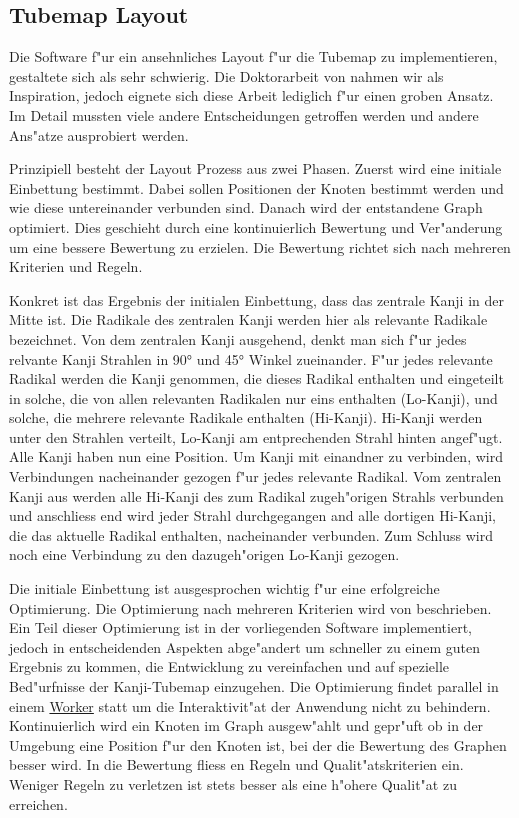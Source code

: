 \subsection{Tubemap Layout}

Die Software f"ur ein ansehnliches Layout f"ur die Tubemap zu
implementieren, gestaltete sich als sehr schwierig. Die Doktorarbeit von
\cite{automaticlayoutmetro08} nahmen wir als Inspiration, jedoch eignete
sich diese Arbeit lediglich f"ur einen groben Ansatz. Im Detail mussten
viele andere Entscheidungen getroffen werden und andere Ans"atze
ausprobiert werden.

Prinzipiell besteht der Layout Prozess aus zwei Phasen. Zuerst wird eine
initiale Einbettung bestimmt. Dabei sollen Positionen der Knoten
bestimmt werden und wie diese untereinander verbunden sind. Danach wird
der entstandene Graph optimiert. Dies geschieht durch eine
kontinuierlich Bewertung und Ver"anderung um eine bessere Bewertung zu
erzielen. Die Bewertung richtet sich nach mehreren Kriterien und Regeln.

Konkret ist das Ergebnis der initialen Einbettung, dass das zentrale
Kanji in der Mitte ist. Die Radikale des zentralen Kanji werden hier als
relevante Radikale bezeichnet. Von dem zentralen Kanji ausgehend, denkt
man sich f"ur jedes relvante Kanji Strahlen in 90° und 45° Winkel
zueinander. F"ur jedes relevante Radikal werden die Kanji genommen, die
dieses Radikal enthalten und eingeteilt in solche, die von allen
relevanten Radikalen nur eins enthalten (Lo-Kanji), und solche, die
mehrere relevante Radikale enthalten (Hi-Kanji). Hi-Kanji werden unter
den Strahlen verteilt, Lo-Kanji am entprechenden Strahl hinten
angef"ugt. Alle Kanji haben nun eine Position. Um Kanji mit einandner
zu verbinden, wird Verbindungen nacheinander gezogen f"ur jedes relevante
Radikal. Vom zentralen Kanji aus werden alle Hi-Kanji des zum Radikal
zugeh"origen Strahls verbunden und anschliess end wird jeder Strahl
durchgegangen and alle dortigen Hi-Kanji, die das aktuelle Radikal
enthalten, nacheinander verbunden. Zum Schluss wird noch eine Verbindung
zu den dazugeh"origen Lo-Kanji gezogen.

Die initiale Einbettung ist ausgesprochen wichtig f"ur eine erfolgreiche
Optimierung. Die Optimierung nach mehreren Kriterien wird von
\cite{automaticmetromap11} beschrieben. Ein Teil dieser Optimierung ist
in der vorliegenden Software implementiert, jedoch in entscheidenden
Aspekten abge"andert um schneller zu einem guten Ergebnis zu kommen, die
Entwicklung zu vereinfachen und auf spezielle Bed"urfnisse der
Kanji-Tubemap einzugehen. Die Optimierung findet parallel in einem
\href{http://www.whatwg.org/specthes/web-apps/current-work/multipage/workers.html}{Worker}
statt um die Interaktivit"at der Anwendung nicht zu behindern.
Kontinuierlich wird ein Knoten im Graph ausgew"ahlt und gepr"uft ob in der
Umgebung eine Position f"ur den Knoten ist, bei der die Bewertung des
Graphen besser wird. In die Bewertung fliess en Regeln und
Qualit"atskriterien ein. Weniger Regeln zu verletzen ist stets besser als
eine h"ohere Qualit"at zu erreichen.

